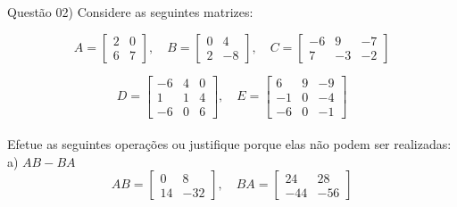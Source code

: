 
\noindent \textcolor{COLOR1}{Questão 02)} Considere as seguintes matrizes:
\\
\newcommand{\mA}{
    \begin{bmatrix}
        2 & 0 \\
        6 & 7
    \end{bmatrix}}
\newcommand{\mB}{
    \begin{bmatrix}
        0 & 4  \\
        2 & -8
    \end{bmatrix}}
\newcommand{\mC}{
    \begin{bmatrix}
        -6 & 9  & -7 \\
        7  & -3 & -2
    \end{bmatrix}}
\newcommand{\mD}{
    \begin{bmatrix}
        -6 & 4 & 0 \\
        1  & 1 & 4 \\
        -6 & 0 & 6
    \end{bmatrix}
}
\newcommand{\mE}{
    \begin{bmatrix}
        6  & 9 & -9 \\
        -1 & 0 & -4 \\
        -6 & 0 & -1
    \end{bmatrix}
}

\[
    A =
    \mA,\hspace{1em}
    B =
    \mB,\hspace{1em}
    C =
    \mC
\]
\newline

\[
    D =
    \mD,\hspace{1em}
    E =
    \mE
\]
\\

Efetue as seguintes operações ou justifique porque elas não podem ser realizadas:
\\

a) $AB-BA$
\\

\[
    AB =
    \begin{bmatrix}
        0  & 8   \\
        14 & -32
    \end{bmatrix},\hspace{1em}
    BA =
    \begin{bmatrix}
        24  & 28  \\
        -44 & -56
    \end{bmatrix}
\]
\\

